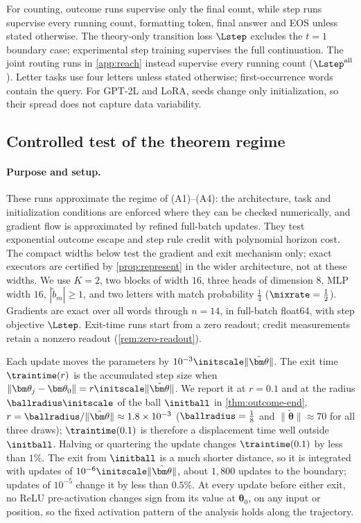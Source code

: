 For counting, outcome runs supervise only the final count, while step runs supervise every running count, formatting token,
final answer and EOS unless stated otherwise. The theory-only transition loss $\Lstep$ excludes the $t=1$ boundary case;
experimental step training supervises the full continuation. The joint routing runs in \cref{app:reach} instead supervise
every running count ($\Lstep^{\mathrm{all}}$). Letter tasks use four letters unless stated otherwise; first-occurrence words contain the query.
For GPT-2L and LoRA, seeds change only initialization, so their spread does not capture data variability.

\subsection{Controlled test of the theorem regime}
\label{app:exp-regime}
\label{app:regime}
\paragraph{Purpose and setup.} These runs approximate the regime of (A1)--(A4): the architecture, task and initialization conditions are enforced where
they can be checked numerically, and gradient flow is approximated by refined full-batch updates. They test exponential outcome
escape and step rule credit with polynomial horizon cost. The compact widths below test the gradient and exit mechanism only;
exact executors are certified by \cref{prop:represent} in the wider architecture, not at these widths.
We use $K=2$, two blocks of width $16$, three heads of dimension $8$, MLP width $16$, $|\tilde b_m|\ge1$,
and two letters with match probability $\tfrac{1}{4}$ ($\mixrate=\tfrac{1}{2}$). Gradients are exact over all words through $n=14$,
in full-batch float64, with step objective $\Lstep$. Exit-time runs start from a zero readout; credit measurements retain a
nonzero readout (\cref{rem:zero-readout}).

Each update moves the parameters by $10^{-3}\initscale\|\tilde{\bm\theta}\|$.
The exit time $\traintime(r)$ is the accumulated step size when $\|\bm\theta_j-\bm\theta_0\|=r\initscale\|\tilde{\bm\theta}\|$. We report it at
$r=0.1$ and at the radius $\ballradius\initscale$ of the ball $\initball$ in \cref{thm:outcome-end}, $r=\ballradius/\|\tilde{\bm\theta}\|\approx1.8\times10^{-3}$
($\ballradius=\tfrac{1}{8}$ and $\|\tilde{\bm\theta}\|\approx70$ for all three draws); $\traintime(0.1)$ is therefore a displacement time well outside $\initball$.
Halving or quartering the update changes $\traintime(0.1)$ by less than $1\%$. The exit from $\initball$ is a much shorter distance, so
it is integrated with updates of $10^{-6}\initscale\|\tilde{\bm\theta}\|$, about $1{,}800$ updates to the boundary; updates of $10^{-5}$ change it by
less than $0.5\%$. At every update before either exit, no ReLU pre-activation
changes sign from its value at $\bm\theta_0$, on any input or position, so the fixed activation pattern of the analysis holds along the trajectory.

